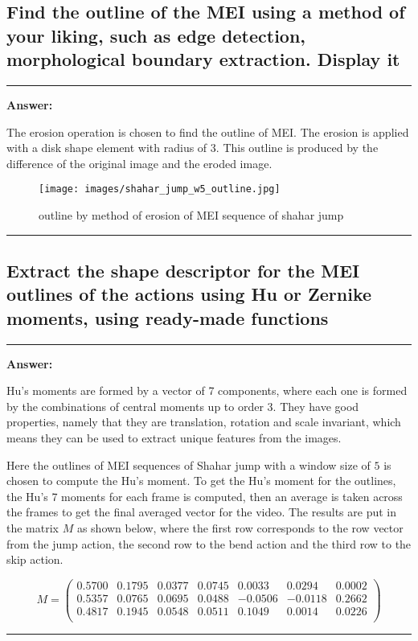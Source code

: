 \documentclass[conference]{styles/acmsiggraph}
\newenvironment{answer}{}{}
\begin{document}
\subsection{Find the outline of the MEI using a method of your liking, such as edge detection, morphological
boundary extraction. Display it}

\begin{answer}

	\rule{\textwidth}{0.4pt}
	\textbf{Answer:}

	The erosion operation is chosen to find the outline of  MEI. The erosion is applied with a disk shape element with radius of $3$. This outline is produced by the difference of the original image and the eroded image. 
	
\begin{figure}[H]
	\centering
	\texttt{[image: images/shahar\_jump\_w5\_outline.jpg]}
	\caption{outline by method of erosion of MEI sequence of shahar jump}
\end{figure}

\rule{\textwidth}{0.4pt}

\end{answer}

\subsection{Extract the shape descriptor for the MEI outlines of the actions using Hu or Zernike moments,
using ready-made functions}
\begin{answer}
	\rule{\textwidth}{0.4pt}
	\textbf{Answer:}

	Hu's moments are formed by a vector of 7 components, where each one is formed by the combinations of central moments up to order $3$. They have good properties, namely that they are translation, rotation and scale invariant, which means they can be used to extract unique features from the images. 

	Here the outlines of MEI sequences of Shahar jump with a window size of $5$ is chosen to compute the Hu's moment. To get the Hu's moment for the outlines, the Hu's 7 moments for each frame is computed, then an average is taken across the frames to get the final averaged vector for the video. The results are put in the matrix $M$ as shown below, where the first row corresponds to the row vector from the jump action, the second row to the bend action and the third row to the skip action.

	$$M = \begin{pmatrix}
		0.5700  &  0.1795  &  0.0377  &  0.0745  &  0.0033  &  0.0294  &  0.0002\\
		0.5357  &  0.0765  &  0.0695  &  0.0488  & -0.0506 &  -0.0118  &  0.2662\\
		0.4817  &  0.1945  &  0.0548  &  0.0511  &  0.1049  &  0.0014  &  0.0226\\
	 \end{pmatrix}$$

	\rule{\textwidth}{0.4pt}

\end{answer}
\end{document}
